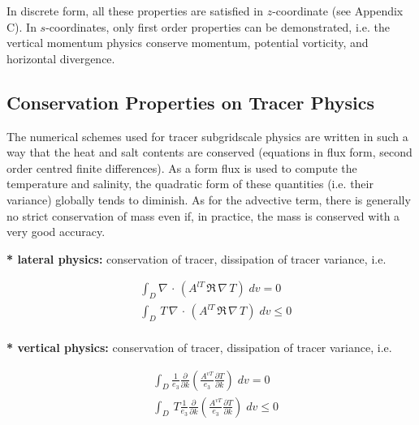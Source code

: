 \documentclass[NEMO_book]{subfiles}
\begin{document}
In discrete form, all these properties are satisfied in $z$-coordinate (see 
Appendix C). In $s$-coordinates, only first order properties can be 
demonstrated, i.e. the vertical momentum physics conserve momentum, 
potential vorticity, and horizontal divergence.

\subsection{Conservation Properties on Tracer Physics}
\label{Invariant_tra_physics}

The numerical schemes used for tracer subgridscale physics are written in 
such a way that the heat and salt contents are conserved (equations in flux 
form, second order centred finite differences). As a form flux is used to 
compute the temperature and salinity, the quadratic form of these quantities 
(i.e. their variance) globally tends to diminish. As for the advective term, 
there is generally no strict conservation of mass even if, in practice, the 
mass is conserved with a very good accuracy. 

\textbf{* lateral physics: }conservation of tracer, dissipation of tracer 
variance, i.e.

\begin{equation} \label{Eq_traldf_t_t2}
\begin{aligned}
&\int_D \nabla\, \cdot\, \left( A^{lT} \,\Re \,\nabla \,T \right)\;dv = 0 \\ 
&\int_D \,T\, \nabla\, \cdot\, \left( A^{lT} \,\Re \,\nabla \,T \right)\;dv \leq 0 \\ 
\end{aligned}
\end{equation}

\textbf{* vertical physics: }conservation of tracer, dissipation of tracer 
variance, i.e.

\begin{equation} \label{Eq_trazdf_t_t2}
\begin{aligned}
& \int_D \frac{1}{e_3 } \frac{\partial }{\partial k}\left( \frac{A^{vT}}{e_3 }  \frac{\partial T}{\partial k}  \right)\;dv = 0 \\ 
& \int_D \,T \frac{1}{e_3 } \frac{\partial }{\partial k}\left( \frac{A^{vT}}{e_3 }  \frac{\partial T}{\partial k}  \right)\;dv \leq 0 \\ 
\end{aligned}
\end{equation}
\end{document}
